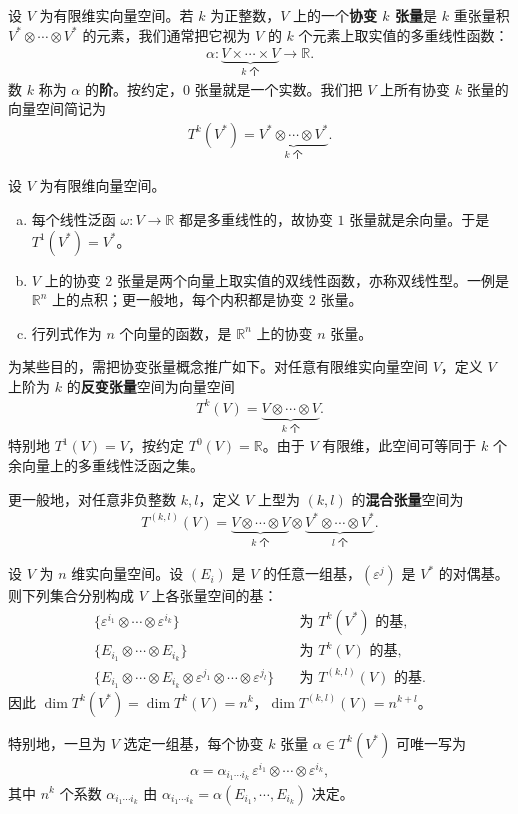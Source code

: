\documentclass[../../main.tex]{subfiles}
\begin{document}
设 $V$ 为有限维实向量空间。若 $k$ 为正整数，$V$ 上的一个\textbf{协变 $k$ 张量}是 $k$ 重张量积 $V^*\otimes\cdots\otimes V^*$ 的元素，我们通常把它视为 $V$ 的 $k$ 个元素上取实值的多重线性函数：
\begin{align*}
\alpha\colon \underbrace{V\times\cdots\times V}_{k\text{ 个}}\to\mathbb{R}.
\end{align*}
数 $k$ 称为 $\alpha$ 的\textbf{阶}。按约定，$0$ 张量就是一个实数。我们把 $V$ 上所有协变 $k$ 张量的向量空间简记为
\begin{align*}
T^k(V^*)=\underbrace{V^*\otimes\cdots\otimes V^*}_{k\text{ 个}}.
\end{align*}

\begin{example}[协变张量]\label{example:ch12-协变张量}
设 $V$ 为有限维向量空间。
\begin{enumerate}[(a)]
\item 每个线性泛函 $\omega\colon V\to\mathbb{R}$ 都是多重线性的，故协变 $1$ 张量就是余向量。于是 $T^1(V^*)=V^*$。
\item $V$ 上的协变 $2$ 张量是两个向量上取实值的双线性函数，亦称双线性型。一例是 $\mathbb{R}^n$ 上的点积；更一般地，每个内积都是协变 $2$ 张量。
\item 行列式作为 $n$ 个向量的函数，是 $\mathbb{R}^n$ 上的协变 $n$ 张量。
\end{enumerate}
\end{example}

为某些目的，需把协变张量概念推广如下。对任意有限维实向量空间 $V$，定义 $V$ 上阶为 $k$ 的\textbf{反变张量}空间为向量空间
\begin{align*}
T^k(V)=\underbrace{V\otimes\cdots\otimes V}_{k\text{ 个}}.
\end{align*}
特别地 $T^1(V)=V$，按约定 $T^0(V)=\mathbb{R}$。由于 $V$ 有限维，此空间可等同于 $k$ 个余向量上的多重线性泛函之集。

更一般地，对任意非负整数 $k,l$，定义 $V$ 上型为 $(k,l)$ 的\textbf{混合张量}空间为
\begin{align*}
T^{(k,l)}(V)=\underbrace{V\otimes\cdots\otimes V}_{k\text{ 个}}\otimes\underbrace{V^*\otimes\cdots\otimes V^*}_{l\text{ 个}}.
\end{align*}

\begin{corollary}[张量空间的基]\label{corollary:ch12-张量空间基}
设 $V$ 为 $n$ 维实向量空间。设 $(E_i)$ 是 $V$ 的任意一组基，$(\varepsilon^j)$ 是 $V^*$ 的对偶基。则下列集合分别构成 $V$ 上各张量空间的基：
\begin{align*}
\{\varepsilon^{i_1}\otimes\cdots\otimes\varepsilon^{i_k}\}&\quad\text{为 }T^k(V^*)\text{ 的基},\\
\{E_{i_1}\otimes\cdots\otimes E_{i_k}\}&\quad\text{为 }T^k(V)\text{ 的基},\\
\{E_{i_1}\otimes\cdots\otimes E_{i_k}\otimes\varepsilon^{j_1}\otimes\cdots\otimes\varepsilon^{j_l}\}&\quad\text{为 }T^{(k,l)}(V)\text{ 的基}.
\end{align*}
因此 $\dim T^k(V^*)=\dim T^k(V)=n^k$，$\dim T^{(k,l)}(V)=n^{k+l}$。
\end{corollary}

特别地，一旦为 $V$ 选定一组基，每个协变 $k$ 张量 $\alpha\in T^k(V^*)$ 可唯一写为
\begin{align*}
\alpha=\alpha_{i_1\cdots  i_k}\,\varepsilon^{i_1}\otimes\cdots\otimes\varepsilon^{i_k},
\end{align*}
其中 $n^k$ 个系数 $\alpha_{i_1\cdots  i_k}$ 由 $\alpha_{i_1\cdots  i_k}=\alpha(E_{i_1},\cdots ,E_{i_k})$ 决定。
\end{document}
